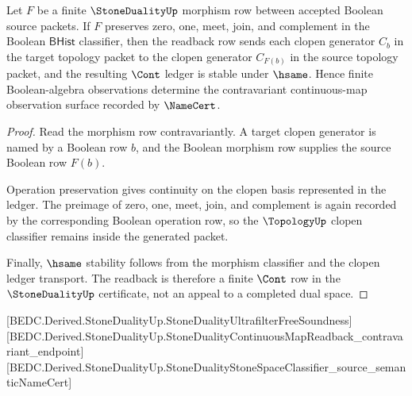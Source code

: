 \begin{theorem}\label{thm:stoneduality-continuous-map-readback}
Let $F$ be a finite $\StoneDualityUp$ morphism row between accepted Boolean source packets. If $F$ preserves zero, one, meet, join, and complement in the Boolean $\mathsf{BHist}$ classifier, then the readback row sends each clopen generator $C_b$ in the target topology packet to the clopen generator $C_{F(b)}$ in the source topology packet, and the resulting $\Cont$ ledger is stable under $\hsame$. Hence finite Boolean-algebra observations determine the contravariant continuous-map observation surface recorded by $\NameCert$.
\end{theorem}

\begin{proof}
Read the morphism row contravariantly. A target clopen generator is named by a Boolean row $b$, and the Boolean morphism row supplies the source Boolean row $F(b)$.

Operation preservation gives continuity on the clopen basis represented in the ledger. The preimage of zero, one, meet, join, and complement is again recorded by the corresponding Boolean operation row, so the $\TopologyUp$ clopen classifier remains inside the generated packet.

Finally, $\hsame$ stability follows from the morphism classifier and the clopen ledger transport. The readback is therefore a finite $\Cont$ row in the $\StoneDualityUp$ certificate, not an appeal to a completed dual space.
\end{proof}

[BEDC.Derived.StoneDualityUp.StoneDualityUltrafilterFreeSoundness]
[BEDC.Derived.StoneDualityUp.StoneDualityContinuousMapReadback\_contravariant\_endpoint]
[BEDC.Derived.StoneDualityUp.StoneDualityStoneSpaceClassifier\_source\_semanticNameCert]

